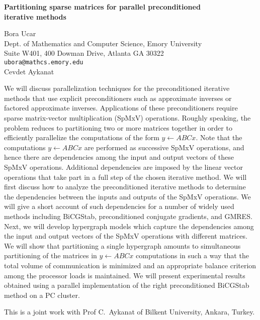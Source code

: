 \documentclass{report}
\begin{document}

\begin{center}
{\large
{\bf Partitioning sparse matrices for parallel preconditioned \\
	iterative methods}}

	Bora Ucar \\
	Dept. of Mathematics and Computer Science, Emory University \\
	Suite W401, 400 Dowman Drive, Atlanta GA 30322 \\
	{\tt ubora@mathcs.emory.edu} \\
	Cevdet Aykanat
\end{center}
We will discuss parallelization techniques for the
preconditioned iterative methods that use explicit
preconditioners such as approximate inverses or factored
approximate inverses. Applications of these preconditioners
require sparse matrix-vector multiplication (SpMxV)
operations. Roughly speaking, the problem reduces to
partitioning two or more matrices together in order to
efficiently parallelize the computations of the form $y\gets
ABCx$. Note that the computations $y\gets ABCx$ are
performed as successive SpMxV operations, and hence there
are dependencies among the input and output vectors of these
SpMxV operations. Additional dependencies are imposed by the
linear vector operations that take part in a full step of
the chosen iterative method. We will first discuss how to
analyze the preconditioned iterative methods to determine
the dependencies between the inputs and outputs of the SpMxV
operations. We will give a short account of such
dependencies for a number of widely used methods including
BiCGStab, preconditioned conjugate gradients, and GMRES.
Next, we will develop hypergraph models which capture the
dependencies among the input and output vectors of the SpMxV
operations with different matrices. We will show that
partitioning a single hypergraph amounts to simultaneous
partitioning of the matrices in $y\gets ABCx$ computations
in such a way that the total volume of communication is
minimized and an appropriate balance criterion among the
processor loads is maintained. We will present experimental
results obtained using a parallel implementation of the
right preconditioned BiCGStab method on a PC cluster.

This is a joint work with Prof C.~Aykanat of Bilkent
University, Ankara, Turkey.



\end{document}

